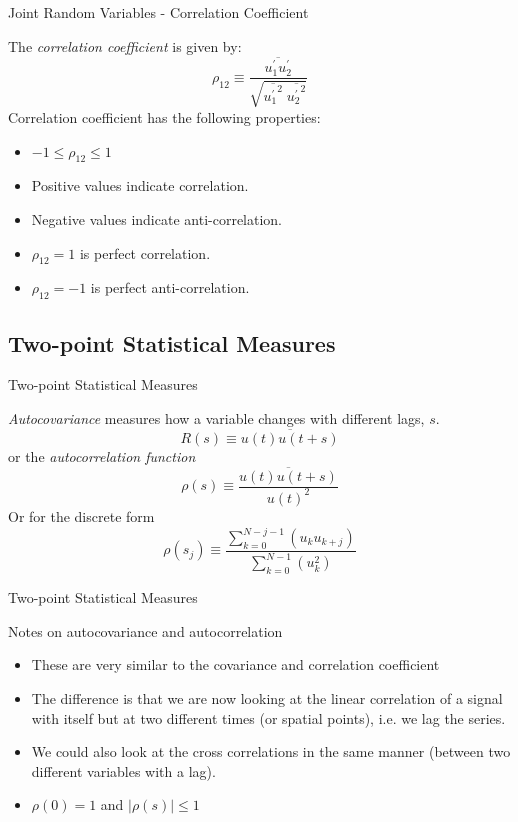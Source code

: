 
\begin{frame}{Joint Random Variables - Correlation Coefficient}
  
  The \textit{correlation coefficient} is given by:
  $$\rho_{12} \equiv \frac{\overline{u_1^\prime u_2^\prime}}{\sqrt{\overline{{u_1^\prime}^2}\; \overline{{u_2^\prime}^2}}}$$
  Correlation coefficient has the following properties:
  \begin{itemize}
  	\item $-1 \leq \rho_{12} \leq 1$
  	\item Positive values indicate correlation.
  	\item Negative values indicate anti-correlation.
  	\item $\rho_{12} = 1$ is perfect correlation.
  	\item $\rho_{12} = -1$ is perfect anti-correlation.
  \end{itemize}
\end{frame}

\subsection{Two-point Statistical Measures}
\begin{frame}{Two-point Statistical Measures}
  
  \textit{Autocovariance} measures how a variable changes with different lags, $s$.
  $$R(s) \equiv \overline{u(t) u(t+s)}$$
  or the \textit{autocorrelation function}
  $$\rho(s) \equiv \frac{ \overline{u(t)u(t+s)}}{u(t)^2}$$
  Or for the discrete form
  $$\rho(s_j) \equiv \frac{ \sum^{N-j-1}_{k=0}(u_ku_{k+j})}{\sum^{N-1}_{k=0}(u_k^2)}$$
  
\end{frame}


\begin{frame}{Two-point Statistical Measures}
  
  Notes on autocovariance and autocorrelation
  \begin{itemize}
  	\item These are very similar to the covariance and correlation coefficient
  	\item The difference is that we are now looking at the linear correlation of a signal with itself but at two different times (or spatial points), i.e. we lag the series.
  	\item We could also look at the cross correlations in the same manner (between two different variables with a lag).
  	\item $\rho(0) = 1$ and $|\rho(s)| \leq 1$
  \end{itemize}
  
\end{frame}

